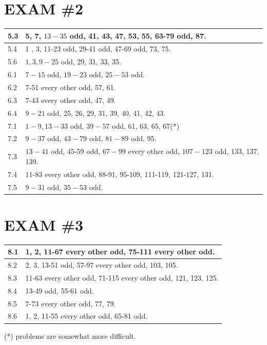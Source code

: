 \documentclass{ximera}
\begin{document}
\section*{EXAM \#2}
\begin{center}
\begin{tabular}{|l|l|}
\hline
5.3 & 5, 7, $13-35$ odd, 41, 43, 47, 53, 55, 63-79 odd, 87. \\
\hline
5.4 & 1 , 3, 11-23 odd, 29-41 odd, 47-69 odd, 73, 75. \\
\hline
5.6 & $1,3,9-25$ odd, 29, 31, 33, 35. \\
\hline
6.1 & $7-15$ odd, $19-23$ odd, $25-53$ odd. \\
\hline
6.2 & 7-51 every other odd, 57, 61. \\
\hline
6.3 & 7-43 every other odd, 47, 49. \\
\hline
6.4 & $9-21$ odd, 25, 26, 29, 31, 39, 40, 41, 42, 43. \\
\hline
7.1 & $1-9,13-33$ odd, $39-57$ odd, 61, 63, 65, 67(*) \\
\hline
7.2 & $9-37$ odd, $43-79$ odd, $81-89$ odd, 95. \\
\hline
7.3 & $13-41$ odd, 45-59 odd, $67-99$ every other odd, $107-123$ odd, 133, 137, 139. \\
\hline
7.4 & 11-83 every other odd, 88-91, 95-109, 111-119, 121-127, 131. \\
\hline
7.5 & $9-31$ odd, $35-53$ odd. \\
\hline
\end{tabular}
\end{center}

\section*{EXAM \#3}
\begin{center}
\begin{tabular}{|l|l|}
\hline
8.1 & 1, 2, 11-67 every other odd, 75-111 every other odd. \\
\hline
8.2 & 2, 3, 13-51 odd, 57-97 every other odd, 103, 105. \\
\hline
8.3 & 11-63 every other odd, 71-115 every other odd, 121, 123, 125. \\
\hline
8.4 & 13-49 odd, 55-61 odd. \\
\hline
8.5 & 7-73 every other odd, 77, 79. \\
\hline
8.6 & 1, 2, 11-55 every other odd, 65-81 odd. \\
\hline
\end{tabular}
\end{center}

(*) problems are somewhat more difficult.
\end{document}
